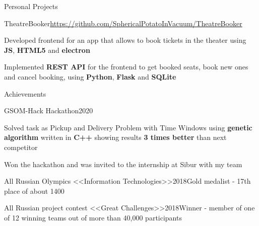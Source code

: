 \documentclass{./resume} %
\begin{document}
\begin{rSection}{Personal Projects}
    \begin{rSubsection}{TheatreBooker}{\url{https://github.com/SphericalPotatoInVacuum/TheatreBooker}}{}{}
        \item Developed frontend for an app that allows to book tickets in the theater using \textbf{JS}, \textbf{HTML5} and \textbf{electron}
        \item Implemented \textbf{REST API} for the frontend to get booked seats, book new ones and cancel booking, using \textbf{Python}, \textbf{Flask} and \textbf{SQLite}
    \end{rSubsection}
\end{rSection}


\begin{rSection}{Achievements}
    \begin{rSubsection}
        {GSOM-Hack Hackathon}{2020}{}{}
        \item Solved task as Pickup and Delivery Problem with Time Windows using
        \textbf{genetic algorithm} written in \textbf{C++} showing
        results \textbf{3 times better} than next competitor
        \item Won the hackathon and was invited to the internship at Sibur with my team
    \end{rSubsection}
    \begin{rSubsubsection}
        {All Russian Olympics <<Information Technologies>>}{2018}{Gold medalist - 17th place of about 1400}{}
    \end{rSubsubsection}
    \begin{rSubsubsection}
        {All Russian project contest <<Great Challenges>>}{2018}{Winner - member of one of 12 winning teams out of more than 40,000 participants}{}
    \end{rSubsubsection}
\end{rSection}






\end{document}
